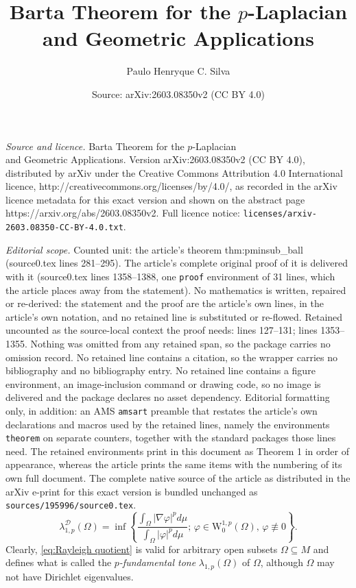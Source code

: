 \documentclass[10pt,a4paper]{amsart}
\title{Barta Theorem for the $p$-Laplacian \\and Geometric Applications}
\author{Paulo Henryque C. Silva}
\date{Source: arXiv:2603.08350v2 (CC BY 4.0)}
\begin{document}
\maketitle

\noindent\emph{Source and licence.} Barta Theorem for the $p$-Laplacian \\and Geometric Applications. Version arXiv:2603.08350v2 (CC BY 4.0), distributed by arXiv under the Creative Commons Attribution 4.0 International licence, http://creativecommons.org/licenses/by/4.0/, as recorded in the arXiv licence metadata for this exact version and shown on the abstract page https://arxiv.org/abs/2603.08350v2. Full licence notice: \texttt{licenses/arxiv-2603.08350-CC-BY-4.0.txt}.\par\smallskip

\noindent\textit{Editorial scope.} Counted unit: the article's theorem thm:pminsub\_ball (source0.tex lines 281--295). The article's complete original proof of it is delivered with it (source0.tex lines 1358--1388, one \texttt{proof} environment of 31 lines, which the article places away from the statement). No mathematics is written, repaired or re-derived: the statement and the proof are the article's own lines, in the article's own notation, and no retained line is substituted or re-flowed.  Retained uncounted as the source-local context the proof needs: lines 127--131; lines 1353--1355.  Nothing was omitted from any retained span, so the package carries no omission record.  No retained line contains a citation, so the wrapper carries no bibliography and no bibliography entry.  No retained line contains a figure environment, an image-inclusion command or drawing code, so no image is delivered and the package declares no asset dependency.  Editorial formatting only, in addition: an AMS \texttt{amsart} preamble that restates the article's own declarations and macros used by the retained lines, namely the environments \texttt{theorem} on separate counters, together with the standard packages those lines need.  The retained environments print in this document as Theorem 1 in order of appearance, whereas the article prints the same items with the numbering of its own full document.  The complete native source of the article as distributed in the arXiv e-print for this exact version is bundled unchanged as \texttt{sources/195996/source0.tex}.
\begin{equation}\label{eq:Rayleigh quotient}
    \lambda_{1,p}^{\mathcal{D}}(\Omega)
    = \inf \left\{ \frac{\displaystyle \int_{\Omega} |\nabla \varphi |^p d\mu} {\displaystyle \int_{\Omega} |\varphi|^p d\mu}; \, \varphi \in \mathrm{W}^{1,p}_0(\Omega), \, \varphi \not\equiv 0
    \right\}.
\end{equation} Clearly,  \eqref{eq:Rayleigh quotient} is valid for  arbitrary open subsets $\Omega \subseteq M$ and defines what is called the \emph{$p$-fundamental tone} $\lambda_{1,p}(\Omega)$ of  $\Omega $, although $\Omega$ may not have Dirichlet eigenvalues.
\end{document}
